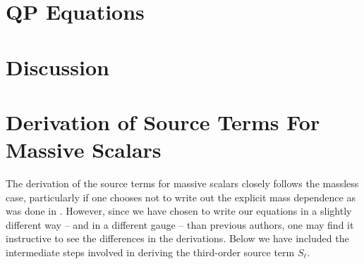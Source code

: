 \documentclass[letterpaper,11pt]{article}
\begin{document}

\section{QP Equations}


\section{Discussion}




\appendix
\section{Derivation of Source Terms For Massive Scalars}
\label{source term derivation}
The derivation of the source terms for massive scalars closely follows the massless case, particularly if one chooses not to write out the explicit mass dependence as was done in \cite{1810.04753}. However, since we have chosen to write our equations in a slightly different way -- and in a different gauge -- than previous authors, one may find it instructive to see the differences in the derivations. Below we have included the intermediate steps involved in deriving the third-order source term $S_\ell$.
\end{document}
